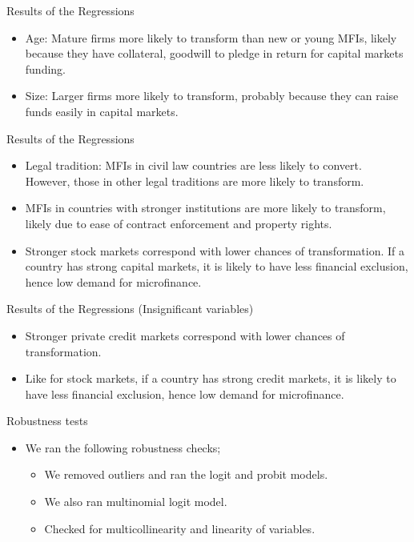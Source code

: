 \documentclass[
  ignorenonframetext,
]{beamer}
\begin{document}
\begin{frame}{Results of the Regressions}
\protect\hypertarget{results-of-the-regressions-2}{}
\begin{itemize}
\item
  Age: Mature firms more likely to transform than new or young MFIs,
  likely because they have collateral, goodwill to pledge in return for
  capital markets funding.
\item
  Size: Larger firms more likely to transform, probably because they can
  raise funds easily in capital markets.
\end{itemize}
\end{frame}

\begin{frame}{Results of the Regressions}
\protect\hypertarget{results-of-the-regressions-3}{}
\begin{itemize}
\item
  Legal tradition: MFIs in civil law countries are less likely to
  convert. However, those in other legal traditions are more likely to
  transform.
\item
  MFIs in countries with stronger institutions are more likely to
  transform, likely due to ease of contract enforcement and property
  rights.
\item
  Stronger stock markets correspond with lower chances of
  transformation. If a country has strong capital markets, it is likely
  to have less financial exclusion, hence low demand for microfinance.
\end{itemize}
\end{frame}

\begin{frame}{Results of the Regressions (Insignificant variables)}
\protect\hypertarget{results-of-the-regressions-insignificant-variables}{}
\begin{itemize}
\item
  Stronger private credit markets correspond with lower chances of
  transformation.
\item
  Like for stock markets, if a country has strong credit markets, it is
  likely to have less financial exclusion, hence low demand for
  microfinance.
\end{itemize}
\end{frame}

\begin{frame}{Robustness tests}
\protect\hypertarget{robustness-tests}{}
\begin{itemize}
\item
  We ran the following robustness checks;

  \begin{itemize}
  \item
    We removed outliers and ran the logit and probit models.
  \item
    We also ran multinomial logit model.
  \item
    Checked for multicollinearity and linearity of variables.
  \end{itemize}
\end{itemize}
\end{frame}
\end{document}
